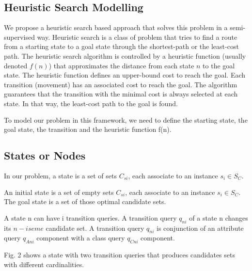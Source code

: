 \subsection{Heuristic Search Modelling} 
We propose a heuristic search based approach that solves this problem in a semi-supervised way. Heuristic search is a class of problem that tries to find a route from a starting state to a goal state through the shortest-path or the least-cost path. The heuristic search algorithm is controlled by a heuristic function (usually denoted $f(n)$) that approximates the distance from each state $n$ to the goal state. The heuristic function defines an upper-bound cost to reach the goal. Each transition (movement) has an associated cost to reach the goal. The algorithm guarantees that the transition with the minimal cost is always selected at each state. In that way,  the least-cost path to the goal is found. 

To model our problem in this framework, we need to define the starting state, the goal state, the transition and the heuristic function f(n).

\subsection{States or Nodes} 

\begin{definition}[A State] In our problem, a state is a set of sets $C_{si}$, each associate to an instance $s_i \in S_C$. 
\end{definition}  

\begin{definition} An initial state is a set of empty sets $C_{si}$, each associate to an instance $s_i \in S_C$. The goal state is a set of those optimal candidate sets.
\end{definition}  

\begin{definition} A state n can have i transition queries. A transition query $q_{ni}$ of a state n changes its $n-iseme$ candidate set.  A transition query $q_{ni}$ is conjunction of an attribute query $q_{Ani}$ component with a class query $q_{Cni}$ component. 
\end{definition}   

Fig. 2 shows a state with two transition queries that produces candidates sets with different cardinalities. 

